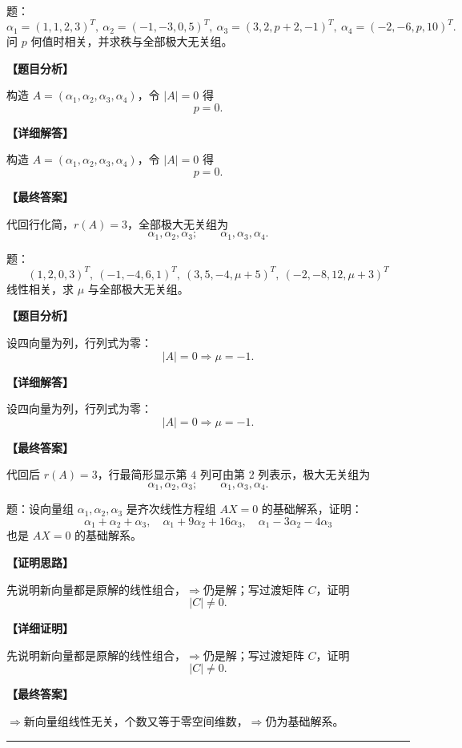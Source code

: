 ﻿\documentclass[11pt,a4paper,UTF8]{ctexart}
\begin{document}
\begin{answerbox}[2023--2024 解答三：参数 p 与秩]
题：
\[
\alpha_1=(1,1,2,3)^T,\ \alpha_2=(-1,-3,0,5)^T,\
\alpha_3=(3,2,p+2,-1)^T,\ \alpha_4=(-2,-6,p,10)^T.
\]
问 $p$ 何值时相关，并求秩与全部极大无关组。

\textbf{【题目分析】}

构造 $A=(\alpha_1,\alpha_2,\alpha_3,\alpha_4)$，令 $|A|=0$ 得
\[p=0.\]

\textbf{【详细解答】}

构造 $A=(\alpha_1,\alpha_2,\alpha_3,\alpha_4)$，令 $|A|=0$ 得
\[p=0.\]

\textbf{【最终答案】}

代回行化简，$r(A)=3$，全部极大无关组为
\[\alpha_1,\alpha_2,\alpha_3;\qquad \alpha_1,\alpha_3,\alpha_4.\]
\end{answerbox}
\begin{answerbox}
题：
\[
(1,2,0,3)^T,\ (-1,-4,6,1)^T,\ (3,5,-4,\mu+5)^T,\ (-2,-8,12,\mu+3)^T
\]
线性相关，求 $\mu$ 与全部极大无关组。

\textbf{【题目分析】}

设四向量为列，行列式为零：
\[|A|=0\Rightarrow \mu=-1.\]

\textbf{【详细解答】}

设四向量为列，行列式为零：
\[|A|=0\Rightarrow \mu=-1.\]

\textbf{【最终答案】}

代回后 $r(A)=3$，行最简形显示第 $4$ 列可由第 $2$ 列表示，极大无关组为
\[\alpha_1,\alpha_2,\alpha_3;\qquad \alpha_1,\alpha_3,\alpha_4.\]
\end{answerbox}
\begin{answerbox}
题：设向量组 $\alpha_1,\alpha_2,\alpha_3$ 是齐次线性方程组 $AX=0$ 的基础解系，证明：
\[
\alpha_1+\alpha_2+\alpha_3,\quad
\alpha_1+9\alpha_2+16\alpha_3,\quad
\alpha_1-3\alpha_2-4\alpha_3
\]
也是 $AX=0$ 的基础解系。

\textbf{【证明思路】}

先说明新向量都是原解的线性组合，$\Rightarrow$仍是解；写过渡矩阵 $C$，证明
\[|C|\ne0.\]

\textbf{【详细证明】}

先说明新向量都是原解的线性组合，$\Rightarrow$仍是解；写过渡矩阵 $C$，证明
\[|C|\ne0.\]

\textbf{【最终答案】}

$\Rightarrow$新向量组线性无关，个数又等于零空间维数，$\Rightarrow$仍为基础解系。
\end{answerbox}
\bigskip\hrule\bigskip
\end{document}
